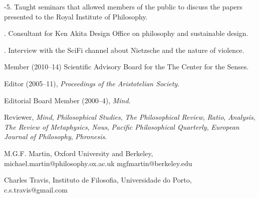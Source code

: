 \documentclass[11pt]{article}
\begin{document}
-5. Taught seminars that allowed members of the public to discuss the papers presented to the Royal Institute of Philosophy.

. Consultant for Ken Akita Design Office on philosophy and sustainable design.

. Interview with the SciFi channel about Nietzsche and the nature of violence.

\bigskip

\medskip


\ind Member (2010--14) Scientific Advisory Board for the The Center for the Senses.

\ind Editor (2005--11), \emph{Proceedings of the Aristotelian Society}.

\ind Editorial Board Member (2000--4), \emph{Mind}. 

\ind Reviewer, \emph{Mind}, \emph{Philosophical Studies},
\emph{The Philosophical Review}, \emph{Ratio}, \emph{Analysis}, \emph{The Review of Metaphysics}, \emph{Nous}, \emph{Pacific Philosophical Quarterly}, \emph{European Journal of Philosophy}, \emph{Phronesis}.


\medskip

\ind M.G.F. Martin, Oxford University and Berkeley, michael.martin@philosophy.ox.ac.uk mgfmartin@berkeley.edu

\ind Charles Travis, Instituto de Filosofia, Universidade do Porto, c.s.travis@gmail.com
\end{document}

